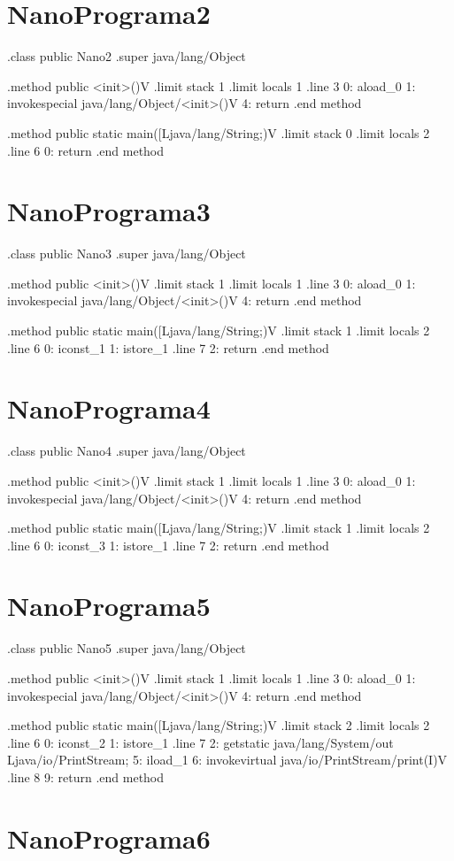 \documentclass[12pt,a4paper,twoside]{report}
\begin{document}
\section{NanoPrograma2}
\begin{terminal}
.class public Nano2
.super java/lang/Object

.method public <init>()V
  .limit stack 1
  .limit locals 1
  .line 3
  0: aload_0
  1: invokespecial java/lang/Object/<init>()V
  4: return
.end method

.method public static main([Ljava/lang/String;)V
  .limit stack 0
  .limit locals 2
  .line 6
  0: return
.end method

\end{terminal}\section{NanoPrograma3}
\begin{terminal}
.class public Nano3
.super java/lang/Object

.method public <init>()V
  .limit stack 1
  .limit locals 1
  .line 3
  0: aload_0
  1: invokespecial java/lang/Object/<init>()V
  4: return
.end method

.method public static main([Ljava/lang/String;)V
  .limit stack 1
  .limit locals 2
  .line 6
  0: iconst_1
  1: istore_1
  .line 7
  2: return
.end method
\end{terminal}\section{NanoPrograma4}
\begin{terminal}
.class public Nano4
.super java/lang/Object

.method public <init>()V
  .limit stack 1
  .limit locals 1
  .line 3
  0: aload_0
  1: invokespecial java/lang/Object/<init>()V
  4: return
.end method

.method public static main([Ljava/lang/String;)V
  .limit stack 1
  .limit locals 2
  .line 6
  0: iconst_3
  1: istore_1
  .line 7
  2: return
.end method
\end{terminal}\section{NanoPrograma5}
\begin{terminal}
.class public Nano5
.super java/lang/Object

.method public <init>()V
  .limit stack 1
  .limit locals 1
  .line 3
  0: aload_0
  1: invokespecial java/lang/Object/<init>()V
  4: return
.end method

.method public static main([Ljava/lang/String;)V
  .limit stack 2
  .limit locals 2
  .line 6
  0: iconst_2
  1: istore_1
  .line 7
  2: getstatic java/lang/System/out Ljava/io/PrintStream;
  5: iload_1
  6: invokevirtual java/io/PrintStream/print(I)V
  .line 8
  9: return
.end method

\end{terminal}\section{NanoPrograma6}
\end{document}

